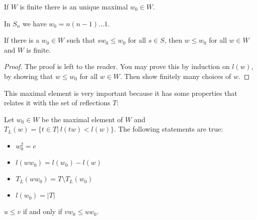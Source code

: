 \begin{corollary}
If $W$ is finite there is an unique maximal $w_0 \in W$.
\end{corollary}

\begin{example}
  In $S_n$ we have $w_0 = n(n-1) \dots 1$.
\end{example}

\begin{corollary}
  If there is a $w_0 \in W$ such that $sw_0 \leq w_0$ for all $s \in S$, then $w \leq w_0$ for all $w \in W$ and $W$ is finite.
\end{corollary}

\begin{proof}
  The proof is left to the reader. You may prove this by induction on $l(w)$, by showing that $w \leq w_0$ for all $w \in W$. Then show finitely many choices of $w$.
\end{proof}

This maximal element is very important because it has some properties that relates it with the set of reflections $T$:

\begin{proposition}
  Let $w_0 \in W$ be the maximal element of $W$ and $T_L(w) = \{t\in T |\  l(tw) < l(w)\}$. The following statements are true:
  \begin{itemize}
    \item $w_0^2 = e$
    \item $l(ww_0) = l(w_0) - l(w)$
    \item $T_L(ww_0) = T \setminus T_L(w_0)$
    \item $l(w_0) = |T|$
  \end{itemize}
\end{proposition}

\begin{corollary}
  $u \leq v$ if and only if $vw_0 \leq uw_0$.
\end{corollary}
